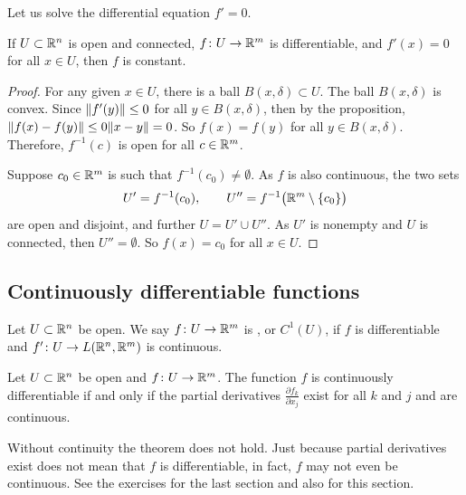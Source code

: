 Let us solve the differential equation $f' = 0$.

\begin{cor}
If $U \subset {\mathbb{R}}^n$ is open and connected, $f \colon U \to {\mathbb{R}}^m$ is
differentiable,
and $f'(x) = 0$ for all $x \in U$, then $f$ is constant.
\end{cor}

\begin{proof}
For any given $x \in U$, there is a ball $B(x,\delta) \subset U$.  The ball
$B(x,\delta)$ is convex.  Since
$\lVert {f'(y)} \rVert \leq 0$ for all $y \in B(x,\delta)$, then by the proposition,
$\lVert {f(x)-f(y)} \rVert \leq 0 \lVert {x-y} \rVert = 0$.  So $f(x) = f(y)$ for all $y \in
B(x,\delta)$.
Therefore, $f^{-1}(c)$ is open for all $c \in {\mathbb{R}}^m$.

Suppose $c_0 \in {\mathbb{R}}^m$ is such that
$f^{-1}(c_0) \not= \emptyset$. 
As $f$ is also continuous,
the two sets
\begin{equation*}
U' = f^{-1}(c_0), \qquad U'' = f^{-1}\bigl({\mathbb{R}}^m\setminus\{c_0\}\bigr)
\end{equation*}
are open and disjoint, and further $U = U' \cup U''$.  As $U'$ is nonempty
and $U$ is connected, then
$U'' = \emptyset$.  So $f(x) = c_0$ for all $x \in U$.
\end{proof}

\subsection{Continuously differentiable functions}

\begin{defn}
Let $U \subset {\mathbb{R}}^n$ be open.
We say $f \colon U \to {\mathbb{R}}^m$ is
\emph{},
or $C^1(U)$,
if $f$ is differentiable and $f' \colon U \to L({\mathbb{R}}^n,{\mathbb{R}}^m)$
is continuous.
\end{defn}

\begin{prop} \label{mv:prop:contdiffpartials}
Let $U \subset {\mathbb{R}}^n$ be open and
$f \colon U \to {\mathbb{R}}^m$.  The function
$f$ is continuously differentiable if and only if 
the partial derivatives $\frac{\partial f_k}{\partial x_j}$
exist for all $k$ and $j$ and are continuous.
\end{prop}

Without continuity the theorem does not hold.  Just because
partial derivatives exist does not mean that $f$ is differentiable,
in fact, $f$ may not even be continuous.  See the exercises
for the last section and also for this section.

